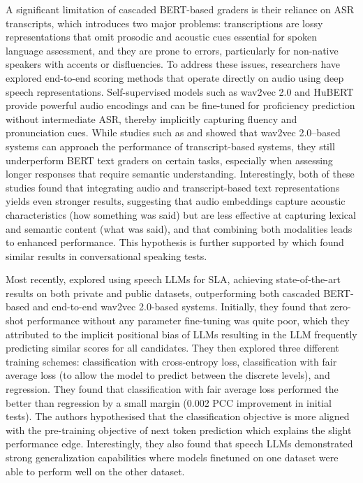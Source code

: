 \documentclass{report}
\begin{document}
A significant limitation of cascaded BERT-based graders is their reliance on ASR transcripts, which introduces two major problems: transcriptions are lossy representations that omit prosodic and acoustic cues essential for spoken language assessment, and they are prone to errors, particularly for non-native speakers with accents or disfluencies. To address these issues, researchers have explored end-to-end scoring methods that operate directly on audio using deep speech representations. Self-supervised models such as wav2vec 2.0 \citep{baevski2020wav2vec20frameworkselfsupervised} and HuBERT \citep{hsu2021hubertselfsupervisedspeechrepresentation} provide powerful audio encodings and can be fine-tuned for proficiency prediction without intermediate ASR, thereby implicitly capturing fluency and pronunciation cues. While studies such as \citet{bannò2022proficiencyassessmentl2spoken} and \citet{bannò2022l2proficiencyassessmentusing} showed that wav2vec 2.0–based systems can approach the performance of transcript-based systems, they still underperform BERT text graders on certain tasks, especially when assessing longer responses that require semantic understanding. Interestingly, both of these studies found that integrating audio and transcript-based text representations yields even stronger results, suggesting that audio embeddings capture acoustic characteristics (how something was said) but are less effective at capturing lexical and semantic content (what was said), and that combining both modalities leads to enhanced performance. This hypothesis is further supported by \citet{mcknight_civelekoglu_gales_banno_liusie_knill_2023} which found similar results in conversational speaking tests.

Most recently, \citet{ma2025assessment} explored using speech LLMs for SLA, achieving state-of-the-art results on both private \citep{Ludlow2020OfficialQuick} and public \citep{knill2024sandi} datasets, outperforming both cascaded BERT-based and end-to-end wav2vec 2.0-based systems. Initially, they found that zero-shot performance without any parameter fine-tuning was quite poor, which they attributed to the implicit positional bias of LLMs \citep{liusie2023mitigatingwordbiaszeroshot} resulting in the LLM frequently predicting similar scores for all candidates. They then explored three different training schemes: classification with cross-entropy loss, classification with fair average loss (to allow the model to predict between the discrete levels), and regression. They found that classification with fair average loss performed the better than regression by a small margin (0.002 PCC improvement in initial tests). The authors hypothesised that the classification objective is more aligned with the pre-training objective of next token prediction which explains the slight performance edge. Interestingly, they also found that speech LLMs demonstrated strong generalization capabilities where models finetuned on one dataset were able to perform well on the other dataset.
\end{document}

